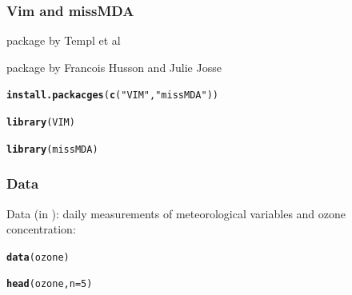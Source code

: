 \documentclass[12pt]{beamer}\usepackage[]{graphicx}\usepackage[]{color}
\makeatletter
\newcommand{\hlnum}[1]{\textcolor[rgb]{0.686,0.059,0.569}{#1}}%
\newcommand{\hlstr}[1]{\textcolor[rgb]{0.192,0.494,0.8}{#1}}%
\newcommand{\hlstd}[1]{\textcolor[rgb]{0.345,0.345,0.345}{#1}}%
\newcommand{\hlkwc}[1]{\textcolor[rgb]{0.333,0.667,0.333}{#1}}%
\newcommand{\hlkwd}[1]{\textcolor[rgb]{0.737,0.353,0.396}{\textbf{#1}}}%
\newenvironment{kframe}{%
 \def\at@end@of@kframe{}%
 \ifinner\ifhmode%
  \def\at@end@of@kframe{\end{minipage}}%
  \begin{minipage}{\columnwidth}%
 \fi\fi%
 \def\FrameCommand##1{\hskip\@totalleftmargin \hskip-\fboxsep
 \colorbox{shadecolor}{##1}\hskip-\fboxsep
     \hskip-\linewidth \hskip-\@totalleftmargin \hskip\columnwidth}%
 \MakeFramed {\advance\hsize-\width
   \@totalleftmargin\z@ \linewidth\hsize
   \@setminipage}}%
 {\par\unskip\endMakeFramed%
 \at@end@of@kframe}
\newenvironment{knitrout}{}{} %
\makeatother
\begin{document}
\begin{frame}[fragile]
\frametitle{Vim and missMDA}

\bi
  \item package  by Templ et al
  \item package  by Francois Husson and Julie Josse
\ei
\begin{knitrout}\footnotesize
{}\color{fgcolor}\begin{kframe}
\begin{alltt}
\hlkwd{install.packacges}\hlstd{(}\hlkwd{c}\hlstd{(}\hlstr{"VIM"}\hlstd{,} \hlstr{"missMDA"}\hlstd{))}
\end{alltt}
\end{kframe}
\end{knitrout}

\begin{knitrout}\footnotesize
{}\color{fgcolor}\begin{kframe}
\begin{alltt}
\hlkwd{library}\hlstd{(VIM)}
\end{alltt}


{\ttfamily\noindent\bfseries\color{errorcolor}{\#\# Error in library(VIM): there is no package called 'VIM'}}\begin{alltt}
\hlkwd{library}\hlstd{(missMDA)}
\end{alltt}


{\ttfamily\noindent\bfseries\color{errorcolor}{\#\# Error in library(missMDA): there is no package called 'missMDA'}}\end{kframe}
\end{knitrout}

\end{frame}


\begin{frame}[fragile]
\frametitle{Data }

Data  (in ): daily measurements of meteorological variables and ozone concentration:
\begin{knitrout}\tiny
{}\color{fgcolor}\begin{kframe}
\begin{alltt}
\hlkwd{data}\hlstd{(ozone)}
\end{alltt}


{\ttfamily\noindent\color{warningcolor}{\#\# Warning in data(ozone): data set 'ozone' not found}}\begin{alltt}
\hlkwd{head}\hlstd{(ozone,} \hlkwc{n} \hlstd{=} \hlnum{5}\hlstd{)}
\end{alltt}


{\ttfamily\noindent\bfseries\color{errorcolor}{\#\# Error in head(ozone, n = 5): object 'ozone' not found}}\end{kframe}
\end{knitrout}

\end{frame}
\end{document}
